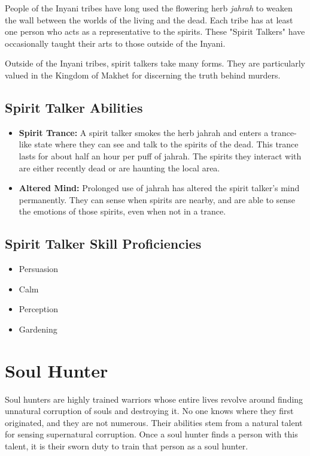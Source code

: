 \begin{multicols}{2}
People of the Inyani tribes have long used the flowering herb \textit{jahrah} 
to weaken the wall between the worlds of the living and the dead. Each tribe
has at least one person who acts as a representative to the spirits. These
"Spirit Talkers" have occasionally taught their arts to those outside of the
Inyani.

Outside of the Inyani tribes, spirit talkers take many forms. They are
particularly valued in the Kingdom of Makhet for discerning the truth
behind murders.

\subsection{Spirit Talker Abilities}

\begin{itemize}
  \item \textbf{Spirit Trance:} A spirit talker smokes the herb jahrah and
    enters a trance-like state where they can see and talk to the spirits of
    the dead. This trance lasts for about half an hour per puff of jahrah. The
    spirits they interact with are either recently dead or are haunting the
    local area.
  \item \textbf{Altered Mind:} Prolonged use of jahrah has altered the spirit
    talker's mind permanently. They can sense when spirits are nearby, and are
    able to sense the emotions of those spirits, even when not in a trance.
\end{itemize}

\subsection{Spirit Talker Skill Proficiencies}

\begin{itemize}
  \item Persuasion
  \item Calm
  \item Perception
  \item Gardening
\end{itemize}

\section{Soul Hunter}

Soul hunters are highly trained warriors whose entire lives revolve around
finding unnatural corruption of souls and destroying it. No one knows where
they first originated, and they are not numerous. Their abilities stem from
a natural talent for sensing supernatural corruption. Once a soul hunter 
finds a person with this talent, it is their sworn duty to train that person
as a soul hunter.


\end{multicols}
